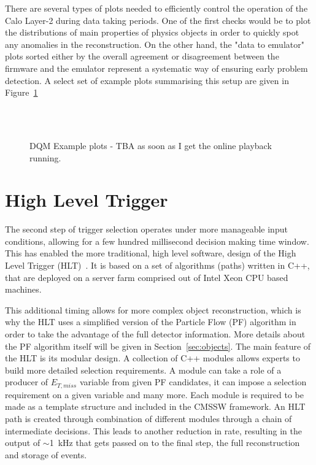 \hspace{10pt} There are several types of plots needed to efficiently control the operation of the Calo Layer-2 during data taking periods. One of the first checks would be to plot the distributions of main properties of physics objects in order to quickly spot any anomalies in the reconstruction. On the other hand, the "data to emulator" plots sorted either by the overall agreement or disagreement between the firmware and the emulator represent a systematic way of ensuring early problem detection.  A select set of example plots summarising this setup are given in Figure~\ref{fig:dqm_plots} 
\begin{figure}[htbp]
  \centering
    \\
    \\
  \caption{DQM Example plots - TBA as soon as I get the online playback running.}
  \label{fig:dqm_plots}
\end{figure}


\section{High Level Trigger}

\hspace{10pt} The second step of trigger selection operates under more manageable input conditions, allowing for a few hundred millisecond decision making time window. This has enabled the more traditional, high level software, design of the High Level Trigger (HLT)~\cite{HLT_performance}. It is based on a set of algorithms (paths) written in C++, that are deployed on a server farm comprised out of Intel Xeon CPU based machines.

\hspace{10pt} This additional timing allows for more complex object reconstruction, which is why the HLT uses a simplified version of the Particle Flow (PF) algorithm in order to take the advantage of the full detector information. More details about the PF algorithm itself will be given in Section~\ref{sec:objects}. The main feature of the HLT is its modular design. A collection of C++ modules allows experts to build more detailed selection requirements. A module can take a role of a producer of $E_{T,miss}$ variable from given PF candidates, it can impose a selection requirement on a given variable and many more. Each module is required to be made as a template structure and included in the CMSSW framework. An HLT path is created through combination of different modules through a chain of intermediate decisions. This leads to another reduction in rate, resulting in the output of $\sim$1~kHz that gets passed on to the final step, the full reconstruction and storage of events.

